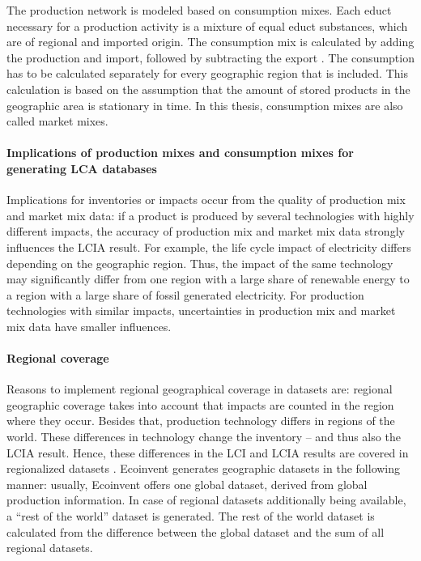 The production network is modeled based on consumption mixes. Each educt necessary for a production activity is a mixture of equal educt substances, which are of regional and imported origin.  The consumption mix is calculated by adding the production and import, followed by subtracting the export \cite{Wernet.2016}. The consumption has to be calculated separately for every geographic region that is included. This calculation is based on the assumption that the amount of stored products in the geographic area is stationary in time. In this thesis, consumption mixes are also called market mixes.

\paragraph{Implications of production mixes and consumption mixes for generating LCA databases}

Implications for inventories or impacts occur from the quality of production mix and market mix data: if a product is produced by several technologies with highly different impacts, the accuracy of production mix and market mix data strongly influences the  LCIA result. For example,  the life cycle impact of electricity differs depending on the geographic region. Thus, the impact of the same technology may significantly differ from one region with a large share of renewable energy to a region with a large share of fossil generated electricity. For production technologies with similar impacts, uncertainties in production mix and market mix data have smaller influences.

\paragraph{Regional coverage}
Reasons to implement regional geographical coverage in datasets are: regional geographic coverage takes into account that impacts are counted in the region where they occur. Besides that,  production technology differs in regions of the world. These differences in technology change the inventory -- and thus also the LCIA result. Hence, these differences in the LCI and LCIA results are covered in regionalized datasets \cite{Wernet.2016}. Ecoinvent generates geographic datasets in the following manner:  usually, Ecoinvent offers one global dataset, derived from global production information. In case of regional datasets additionally being available, a ``rest of the world'' dataset is generated. The rest of the world dataset is calculated from the difference between the global dataset and the sum of all regional datasets.

